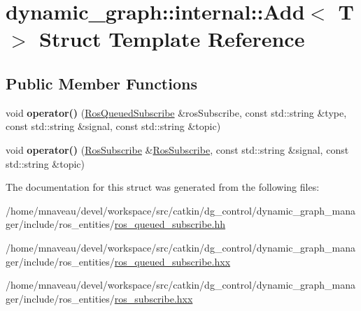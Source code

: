 \hypertarget{structdynamic__graph_1_1internal_1_1Add}{}\section{dynamic\+\_\+graph\+:\+:internal\+:\+:Add$<$ T $>$ Struct Template Reference}
\label{structdynamic__graph_1_1internal_1_1Add}
\subsection*{Public Member Functions}
\begin{DoxyCompactItemize}
\item 
void {\bfseries operator()} (\hyperlink{classdynamic__graph_1_1RosQueuedSubscribe}{Ros\+Queued\+Subscribe} \&ros\+Subscribe, const std\+::string \&type, const std\+::string \&signal, const std\+::string \&topic)\hypertarget{structdynamic__graph_1_1internal_1_1Add_a9d0622abc8f4d539373884419740282b}{}\label{structdynamic__graph_1_1internal_1_1Add_a9d0622abc8f4d539373884419740282b}

\item 
void {\bfseries operator()} (\hyperlink{classdynamic__graph_1_1RosSubscribe}{Ros\+Subscribe} \&\hyperlink{classdynamic__graph_1_1RosSubscribe}{Ros\+Subscribe}, const std\+::string \&signal, const std\+::string \&topic)\hypertarget{structdynamic__graph_1_1internal_1_1Add_a12302c2102a5966f102a18c983926bb6}{}\label{structdynamic__graph_1_1internal_1_1Add_a12302c2102a5966f102a18c983926bb6}

\end{DoxyCompactItemize}


The documentation for this struct was generated from the following files\+:\begin{DoxyCompactItemize}
\item 
/home/mnaveau/devel/workspace/src/catkin/dg\+\_\+control/dynamic\+\_\+graph\+\_\+manager/include/ros\+\_\+entities/\hyperlink{ros__queued__subscribe_8hh}{ros\+\_\+queued\+\_\+subscribe.\+hh}\item 
/home/mnaveau/devel/workspace/src/catkin/dg\+\_\+control/dynamic\+\_\+graph\+\_\+manager/include/ros\+\_\+entities/\hyperlink{ros__queued__subscribe_8hxx}{ros\+\_\+queued\+\_\+subscribe.\+hxx}\item 
/home/mnaveau/devel/workspace/src/catkin/dg\+\_\+control/dynamic\+\_\+graph\+\_\+manager/include/ros\+\_\+entities/\hyperlink{ros__subscribe_8hxx}{ros\+\_\+subscribe.\+hxx}\end{DoxyCompactItemize}

